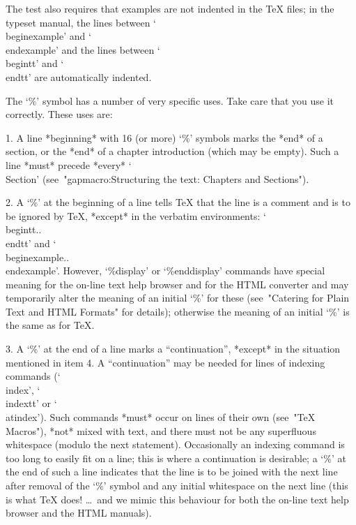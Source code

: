 The test also requires that examples are not indented
in the {\TeX} files; in the typeset manual,
the lines between `\\beginexample' and `\\endexample'
and the lines between `\\begintt' and `\\endtt' are automatically
indented.



\indextt{\%}
The `\%' symbol has a number of very specific uses. Take  care  that  you
use it correctly. These uses are:
\beginlist%
\item{1.}
A line *beginning* with 16 (or more) `\%' symbols marks the  *end*  of  a
section, or the *end* of a chapter introduction  (which  may  be  empty).
Such  a  line  *must* precede  *every*  `\\Section' 
(see~"gapmacro:Structuring the text: Chapters and Sections").

\item{2.}
A `\%' at the beginning of a line tells {\TeX} that the line is a comment
and is to be ignored by {\TeX}, *except* in  the  verbatim  environments:
`\\begintt..\\endtt'   and    `\\beginexample..\\endexample'.    However,
`\%display' or `\%enddisplay'  commands  have  special  meaning  for  the
on-line text help browser and for the HTML converter and may  temporarily
alter the meaning of an initial `\%' for these (see~"Catering  for  Plain
Text and HTML Formats" for details); otherwise the meaning of an  initial
`\%' is the same as for {\TeX}.

\item{3.}
A `\%' at the end of a line marks a  ``continuation'',  *except*  in  the
situation mentioned in item 4. A ``continuation'' may be needed for lines
of  indexing  commands  (`\\index',  `\\indextt'  or  `\\atindex').  Such
commands *must* occur on lines of their  own  (see~"TeX  Macros"),  *not*
mixed with text, and there must not be any superfluous whitespace (modulo
the next statement). Occasionally an indexing  command  is  too  long  to
easily fit on a line; this is where a continuation is desirable;  a  `\%'
at the end of such a line indicates that the line is to  be  joined  with
the next line after removal of the `\%' symbol and any initial whitespace
on the next line (this is what  {\TeX}  does!  \dots~and  we  mimic  this
behaviour for both the on-line text help browser and the HTML manuals).

